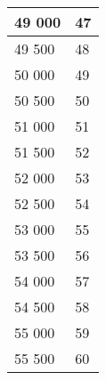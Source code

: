 \begin{table}[H]
	\centering
	\begin{tabularx}{\textwidth}{|X|X|}
		\hline
		49 000 & 47 \\ \hline
		49 500 & 48 \\ \hline
		50 000 & 49 \\ \hline
		50 500 & 50 \\ \hline
		51 000 & 51 \\ \hline
		51 500 & 52 \\ \hline
		52 000 & 53 \\ \hline
		52 500 & 54 \\ \hline
		53 000 & 55 \\ \hline
		53 500 & 56 \\ \hline
		54 000 & 57 \\ \hline
		54 500 & 58 \\ \hline
		55 000 & 59 \\ \hline
		55 500 & 60 \\ \hline
	\end{tabularx}
\end{table}